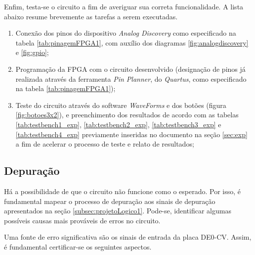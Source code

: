 \documentclass[amsmath,amssymb,floatfix]{report}
\begin{document}
Enfim, testa-se o circuito a fim de averiguar sua correta funcionalidade. A lista abaixo resume brevemente as tarefas a serem executadas.

\begin{enumerate}
    \item Conexão dos pinos do dispositivo \textit{Analog Discovery} como especificado na tabela \ref{tab:pinagemFPGA1}, com auxílio dos diagramas \ref{fig:analogdiscovery} e \ref{fig:gpio};
    \item Programação da FPGA com o circuito desenvolvido (designação de pinos já realizada através da ferramenta \textit{Pin Planner}, do \textit{Quartus}, como especificado na tabela \ref{tab:pinagemFPGA1});
    \item Teste do circuito através do software \textit{WaveForms} e dos botões (figura \ref{fig:botoes3x2}), e preenchimento dos resultados de acordo com as tabelas \ref{tab:testbench1_exp}, \ref{tab:testbench2_exp}, \ref{tab:testbench3_exp} e \ref{tab:testbench4_exp} previamente inseridas no documento na seção \ref{sec:exp} a fim de acelerar o processo de teste e relato de resultados;
\end{enumerate}

\subsection{Depuração}
\label{subsec:depuracao}

Há a possibilidade de que o circuito não funcione como o esperado. Por isso, é fundamental mapear o processo de depuração aos sinais de depuração apresentados na seção \ref{subsec:projetoLogico1}. Pode-se, identificar algumas possíveis causas mais prováveis de erros no circuito. 

Uma fonte de erro significativa são os sinais de entrada da placa DE0-CV. Assim, é fundamental certificar-se os seguintes aspectos.
\end{document}
